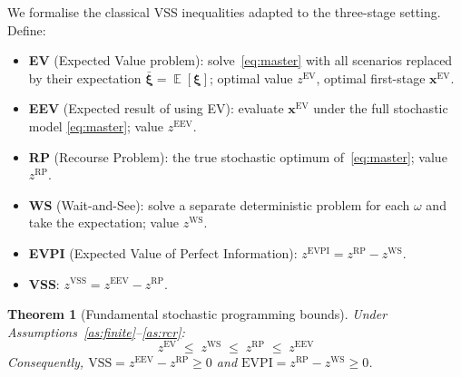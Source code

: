 \documentclass[11pt]{article}
\DeclareMathOperator*{\E}{\mathbb{E}}
\newtheorem{theorem}{Theorem}
\begin{document}
We formalise the classical VSS inequalities adapted to the three-stage
setting. Define:
\begin{itemize}[nosep]
  \item \textbf{EV} (Expected Value problem): solve~\eqref{eq:master}
        with all scenarios replaced by their expectation
        $\bar{\boldsymbol{\xi}} = \E[\boldsymbol{\xi}]$;
        optimal value $z^{\mathrm{EV}}$, optimal first-stage
        $\mathbf{x}^{\mathrm{EV}}$.
  \item \textbf{EEV} (Expected result of using EV): evaluate
        $\mathbf{x}^{\mathrm{EV}}$ under the full stochastic model
        \eqref{eq:master}; value $z^{\mathrm{EEV}}$.
  \item \textbf{RP} (Recourse Problem): the true stochastic optimum
        of~\eqref{eq:master}; value $z^{\mathrm{RP}}$.
  \item \textbf{WS} (Wait-and-See): solve a separate deterministic
        problem for each $\omega$ and take the expectation;
        value $z^{\mathrm{WS}}$.
  \item \textbf{EVPI} (Expected Value of Perfect Information):
        $z^{\mathrm{EVPI}} = z^{\mathrm{RP}} - z^{\mathrm{WS}}$.
  \item \textbf{VSS}: $z^{\mathrm{VSS}} = z^{\mathrm{EEV}} -
        z^{\mathrm{RP}}$.
\end{itemize}

\begin{theorem}[Fundamental stochastic programming bounds]
\label{thm:vss}
Under Assumptions~\ref{as:finite}--\ref{as:rcr}:
\begin{equation}\label{eq:chain}
  z^{\mathrm{EV}} \;\leq\; z^{\mathrm{WS}} \;\leq\;
  z^{\mathrm{RP}} \;\leq\; z^{\mathrm{EEV}}
\end{equation}
Consequently, $\mathrm{VSS} = z^{\mathrm{EEV}} - z^{\mathrm{RP}}
\geq 0$ and
$\mathrm{EVPI} = z^{\mathrm{RP}} - z^{\mathrm{WS}} \geq 0$.
\end{theorem}
\end{document}
